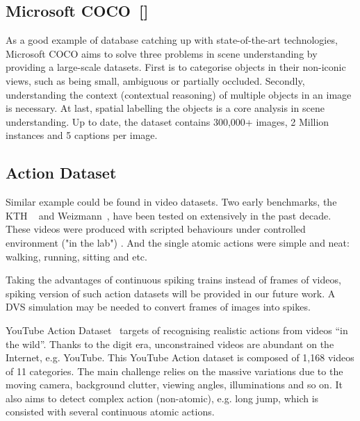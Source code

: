 \subsection{Microsoft COCO~[\cite{lin_microsoft_2014}]}
As a good example of database catching up with state-of-the-art technologies, Microsoft COCO aims to solve three problems in scene understanding by providing a large-scale datasets.
First is to categorise objects in their non-iconic views, such as being small, ambiguous or partially occluded.
Secondly, understanding the context (contextual reasoning) of multiple objects in an image is necessary.
At last, spatial labelling the objects is a core analysis in scene understanding.
Up to date, the dataset contains 300,000+ images, 2 Million instances and 5 captions per image.

\subsection{Action Dataset}
Similar example could be found in video datasets.
Two early benchmarks, the KTH ~\cite{schuldt2004recognizing} and Weizmann~\cite{blank2005actions}, have been tested on extensively in the past decade. 
These videos were produced with scripted behaviours under controlled environment ("in the lab") .
And the single atomic actions were simple and neat: walking, running, sitting and etc.

Taking the advantages of continuous spiking trains instead of frames of videos, spiking version of such action datasets will be provided in our future work.
A DVS simulation may be needed to convert frames of images into spikes.
 
YouTube Action Dataset~\cite{liu_recognizing_2009} targets of recognising realistic actions from videos “in the wild”.
Thanks to the digit era, unconstrained videos are abundant on the Internet, e.g. YouTube.
This YouTube Action dataset is composed of 1,168 videos of 11 categories.
The main challenge relies on the massive variations due to the moving camera, background clutter, viewing angles, illuminations and so on.
It also aims to detect complex action (non-atomic), e.g. long jump, which is consisted with several continuous atomic actions.

